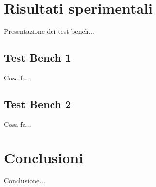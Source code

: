 \documentclass{article}
\begin{document}
\pagebreak
\section{Risultati sperimentali}
Presentazione dei test bench...

\subsection{Test Bench 1}
Cosa fa...

\subsection{Test Bench 2}
Cosa fa...


\section{Conclusioni}
Conclusione...
\end{document}
